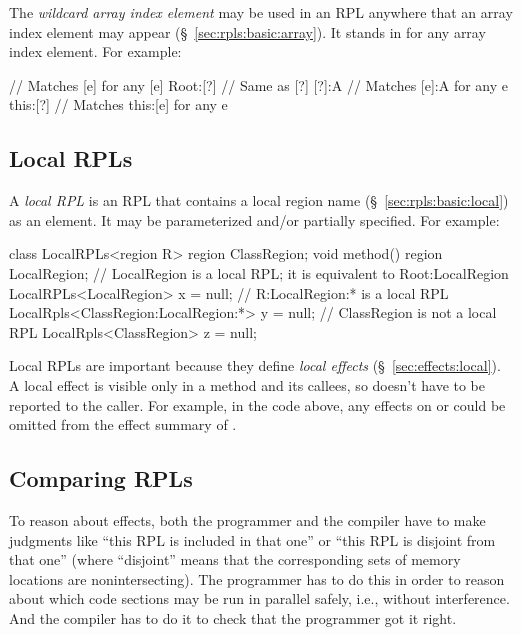 The \emph{wildcard array index element} \kwd{[?]} may be used in an
RPL anywhere that an array index element \kwd{[$e$]} may appear
(\S~\ref{sec:rpls:basic:array}).  It stands in for any array index
element.  For example:
%
\begin{dpjlisting}
[?]        // Matches [e] for any [e]
Root:[?]   // Same as [?]
[?]:A      // Matches [e]:A for any e
this:[?]   // Matches this:[e] for any e
\end{dpjlisting}

\subsection{Local RPLs%
\label{sec:rpls:local}}

A \emph{local RPL} is an RPL that contains a local region name
(\S~\ref{sec:rpls:basic:local}) as an element.  It may be
parameterized and/or partially specified.  For example:
%
\begin{dpjlisting}
class LocalRPLs<region R> {
  region ClassRegion;
  void method() {
    region LocalRegion;
    // LocalRegion is a local RPL; it is equivalent to Root:LocalRegion
    LocalRPLs<LocalRegion> x = null;
    // R:LocalRegion:* is a local RPL
    LocalRpls<ClassRegion:LocalRegion:*> y = null;
    // ClassRegion is not a local RPL
    LocalRpls<ClassRegion> z = null;
  }
}
\end{dpjlisting}
%
Local RPLs are important because they define \emph{local effects}
(\S~\ref{sec:effects:local}).  A local effect is visible only in a
method and its callees, so doesn't have to be reported to the caller.
For example, in the code above, any effects on  or
 could be omitted from the effect summary of
.

\subsection{Comparing RPLs%
\label{sec:rpls:comparing}}

To reason about effects, both the programmer and the compiler have to
make judgments like ``this RPL is included in that one'' or ``this RPL
is disjoint from that one'' (where ``disjoint'' means that the
corresponding sets of memory locations are nonintersecting).  The
programmer has to do this in order to reason about which code sections
may be run in parallel safely, i.e., without interference.  And the
compiler has to do it to check that the programmer got it right.

